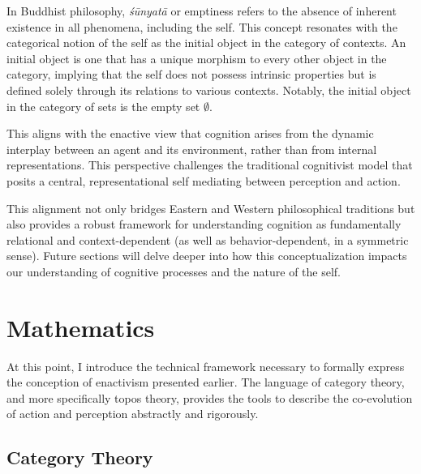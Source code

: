 \documentclass{article}
\begin{document}
In Buddhist philosophy, \emph{śūnyatā} or emptiness refers to the absence of inherent existence in all phenomena, including the self. This concept resonates with the categorical notion of the self as the initial object in the category of contexts. An initial object is one that has a unique morphism to every other object in the category, implying that the self does not possess intrinsic properties but is defined solely through its relations to various contexts. Notably, the initial object in the category of sets is the empty set $\emptyset$.

This aligns with the enactive view that cognition arises from the dynamic interplay between an agent and its environment, rather than from internal representations. This perspective challenges the traditional cognitivist model that posits a central, representational self mediating between perception and action.

This alignment not only bridges Eastern and Western philosophical traditions but also provides a robust framework for understanding cognition as fundamentally relational and context-dependent (as well as behavior-dependent, in a symmetric sense). Future sections will delve deeper into how this conceptualization impacts our understanding of cognitive processes and the nature of the self.

\section{Mathematics}

At this point, I introduce the technical framework necessary to formally express the conception of enactivism presented earlier. The language of category theory, and more specifically topos theory, provides the tools to describe the co-evolution of action and perception abstractly and rigorously.

\subsection{Category Theory}
\end{document}
